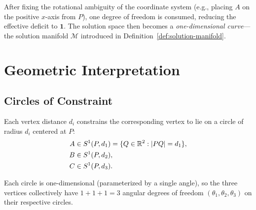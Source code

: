 \begin{remark}
After fixing the rotational ambiguity of the coordinate system (e.g., placing $A$ on the positive $x$-axis from $P$), one degree of freedom is consumed, reducing the effective deficit to $\mathbf{1}$. The solution space then becomes a \emph{one-dimensional curve}---the solution manifold $\mathcal{M}$ introduced in Definition~\ref{def:solution-manifold}.
\end{remark}

\section{Geometric Interpretation}

\subsection{Circles of Constraint}

Each vertex distance $d_i$ constrains the corresponding vertex to lie on a circle of radius $d_i$ centered at $P$:
\begin{align}
A &\in S^1(P, d_1) = \{Q \in \mathbb{R}^2 : \left\lvert PQ \right\rvert = d_1\}, \\
B &\in S^1(P, d_2), \\
C &\in S^1(P, d_3).
\end{align}

Each circle is one-dimensional (parameterized by a single angle), so the three vertices collectively have $1 + 1 + 1 = 3$ angular degrees of freedom $(\theta_1, \theta_2, \theta_3)$ on their respective circles.

